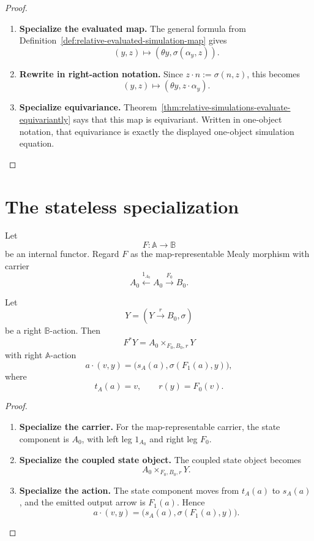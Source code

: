 \begin{proof}
\leavevmode
\begin{enumerate}
\item \textbf{Specialize the evaluated map.}
The general formula from
Definition~\ref{def:relative-evaluated-simulation-map} gives
\[
(y,z)\longmapsto(\theta y,\sigma(\alpha_y,z)).
\]

\item \textbf{Rewrite in right-action notation.}
Since \(z\cdot n:=\sigma(n,z)\), this becomes
\[
(y,z)\longmapsto(\theta y,z\cdot\alpha_y).
\]

\item \textbf{Specialize equivariance.}
Theorem~\ref{thm:relative-simulations-evaluate-equivariantly} says that this
map is equivariant. Written in one-object notation, that equivariance is
exactly the displayed one-object simulation equation.
\end{enumerate}
\end{proof}

\section{The stateless specialization}
\label{sec:relative-stateless-specialization}

Let
\[
F:\mathbb A\to\mathbb B
\]
be an internal functor. Regard \(F\) as the map-representable Mealy morphism
with carrier
\[
A_0\xleftarrow{1_{A_0}}A_0\xrightarrow{F_0}B_0.
\]

\begin{proposition}
\label{prop:relative-stateless-restriction}
Let
\[
Y=(Y\xrightarrow{r}B_0,\sigma)
\]
be a right \(\mathbb B\)-action. Then
\[
F^\ast Y
=
A_0\times_{F_0,B_0,r}Y
\]
with right \(\mathbb A\)-action
\[
a\cdot(v,y)
=
\bigl(s_A(a),\sigma(F_1(a),y)\bigr),
\]
where
\[
t_A(a)=v,
\qquad
r(y)=F_0(v).
\]
\end{proposition}

\begin{proof}
\leavevmode
\begin{enumerate}
\item \textbf{Specialize the carrier.}
For the map-representable carrier, the state component is \(A_0\), with left
leg \(1_{A_0}\) and right leg \(F_0\).

\item \textbf{Specialize the coupled state object.}
The coupled state object becomes
\[
A_0\times_{F_0,B_0,r}Y.
\]

\item \textbf{Specialize the action.}
The state component moves from \(t_A(a)\) to \(s_A(a)\), and the emitted
output arrow is \(F_1(a)\). Hence
\[
a\cdot(v,y)
=
\bigl(s_A(a),\sigma(F_1(a),y)\bigr).
\]
\end{enumerate}
\end{proof}

